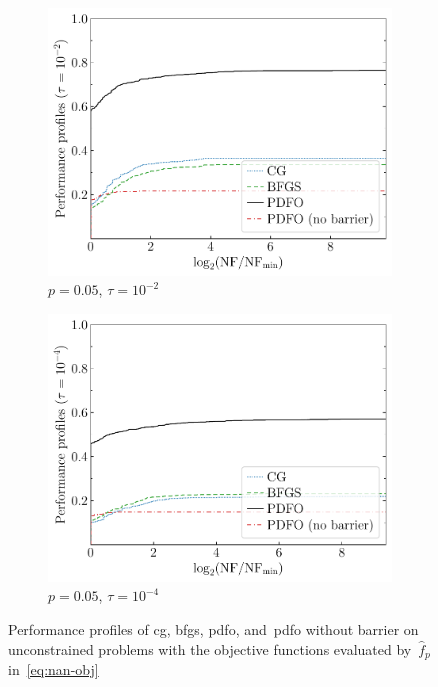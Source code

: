 \documentclass[
    smallextended,  %
    draft,          %
    final,          %
]{svjour3}
\newcommand{\obj}{f}
\begin{document}
\begin{figure}[htbp]
\begin{subfigure}{.48\textwidth}
        \centering
        \includegraphics[width=\textwidth]{perf-nan-bfgs_cg_pdfo-50-0.05-2}
        \caption{$p = 0.05$, $\tau = 10^{-2}$}
    \end{subfigure}
    \hfill
    \begin{subfigure}{.48\textwidth}
        \centering
        \includegraphics[width=\textwidth]{perf-nan-bfgs_cg_pdfo-50-0.05-4}
        \caption{$p = 0.05$, $\tau = 10^{-4}$}
    \end{subfigure}
    \caption{Performance profiles of \gls{cg}, \gls{bfgs}, \gls{pdfo}, and~\gls{pdfo} without
        barrier on unconstrained problems
    with the objective functions evaluated by~$\hat{\obj}_p$ in~\eqref{eq:nan-obj}}
    \label{fig:nan}
\end{figure}
\end{document}
